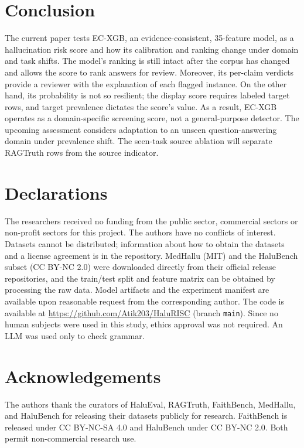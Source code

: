 \documentclass[a4paper,fleqn]{cas-sc}
\begin{document}
\section{Conclusion}\label{sec:conclusion}

The current paper tests EC-XGB, an evidence-consistent, 35-feature model, as a hallucination risk score and how its calibration and ranking change under domain and task shifts. The model's ranking is still intact after the corpus has changed and allows the score to rank answers for review. Moreover, its per-claim verdicts provide a reviewer with the explanation of each flagged instance. On the other hand, its probability is not so resilient; the display score requires labeled target rows, and target prevalence dictates the score's value. As a result, EC-XGB operates as a domain-specific screening score, not a general-purpose detector. The upcoming assessment considers adaptation to an unseen question-answering domain under prevalence shift. The seen-task source ablation will separate RAGTruth rows from the source indicator.

\printcredits

\section*{Declarations}
The researchers received no funding from the public sector, commercial sectors or non-profit sectors for this project. The authors have no conflicts of interest. Datasets cannot be distributed; information about how to obtain the datasets and a license agreement is in the repository. MedHallu (MIT) and the HaluBench subset (CC BY-NC 2.0) were downloaded directly from their official release repositories, and the train/test split and feature matrix can be obtained by processing the raw data. Model artifacts and the experiment manifest are available upon reasonable request from the corresponding author. The code is available at \url{https://github.com/Atik203/HaluRISC} (branch \texttt{main}). Since no human subjects were used in this study, ethics approval was not required. An LLM was used only to check grammar.


\section*{Acknowledgements}
The authors thank the curators of HaluEval, RAGTruth, FaithBench, MedHallu, and HaluBench for releasing their datasets publicly for research. FaithBench is released under CC BY-NC-SA 4.0 and HaluBench under CC BY-NC 2.0. Both permit non-commercial research use.

\sloppy
\setlength{\bibsep}{0pt}
\renewcommand{\bibfont}{\fontsize{8.5pt}{9pt}\selectfont}



\vspace{4pt}
\end{document}
